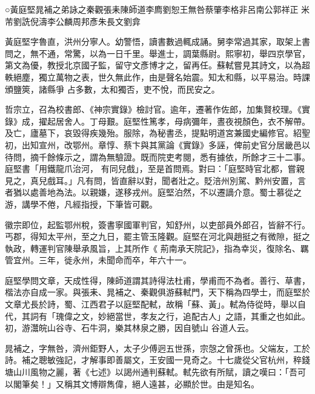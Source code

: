 
\begin{pinyinscope}

 ○黃庭堅晁補之弟詠之秦觀張耒陳師道李廌劉恕王無咎蔡肇李格非呂南公郭祥正
 米芾劉詵倪濤李公麟周邦彥朱長文劉弇



 黃庭堅字魯直，洪州分寧人。幼警悟，讀書數過輒成誦。舅李常過其家，取架上書問之，無不通，常驚，以為一日千里。舉進士，調葉縣尉。熙寧初，舉四京學官，第文為優，教授北京國子監，留守文彥博才之，留再任。蘇軾嘗見其詩文，以為超軼絕塵，獨立萬物之表，世久無此作，由是聲名始震。知太和縣，以平易治。時課頒鹽筴，諸縣爭
 占多數，太和獨否，吏不悅，而民安之。



 哲宗立，召為校書郎、《神宗實錄》檢討官。逾年，遷著作佐郎，加集賢校理。《實錄》成，擢起居舍人。丁母艱。庭堅性篤孝，母病彌年，晝夜視顏色，衣不解帶。及亡，廬墓下，哀毀得疾幾殆。服除，為秘書丞，提點明道宮兼國史編修官。紹聖初，出知宣州，改鄂州。章惇、蔡卞與其黨論《實錄》多誣，俾前史官分居畿邑以待問，摘千餘條示之，謂為無驗證。既而院吏考閱，悉有據依，所餘才三十二事。庭堅書「用鐵龍爪治河，
 有同兒戲」，至是首問焉。對曰：「庭堅時官北都，嘗親見之，真兒戲耳。」凡有問，皆直辭以對，聞者壯之。貶涪州別駕、黔州安置，言者猶以處善地為法。以親嫌，遂移戎州。庭堅泊然，不以遷謫介意。蜀士慕從之游，講學不倦，凡經指授，下筆皆可觀。



 徽宗即位，起監鄂州稅，簽書寧國軍判官，知舒州，以吏部員外郎召，皆辭不行。丐郡，得知太平州，至之九日，罷主管玉隆觀。庭堅在河北與趙挺之有微隙，挺之執政，轉運判官陳舉承風旨，上其所作《
 荊南承天院記》，指為幸災，復除名、羈管宜州。三年，徙永州，未聞命而卒，年六十一。



 庭堅學問文章，天成性得，陳師道謂其詩得法杜甫，學甫而不為者。善行、草書，楷法亦自成一家。與張耒、晁補之、秦觀俱游蘇軾門，天下稱為四學士，而庭堅於文章尤長於詩，蜀、江西君子以庭堅配軾，故稱「蘇、黃」。軾為侍從時，舉以自代，其詞有「瑰偉之文，妙絕當世，孝友之行，追配古人」之語，其重之也如此。初，游灊皖山谷寺、石牛洞，樂其林泉之勝，因自號山
 谷道人云。



 晁補之，字無咎，濟州鉅野人，太子少傅迥五世孫，宗愨之曾孫也。父端友，工於詩。補之聰敏強記，才解事即善屬文，王安國一見奇之。十七歲從父官杭州，稡錢塘山川風物之麗，著《七述》以謁州通判蘇軾。軾先欲有所賦，讀之嘆曰：「吾可以閣筆矣！」又稱其文博辯雋偉，絕人遠甚，必顯於世。由是知名。




\end{pinyinscope}
